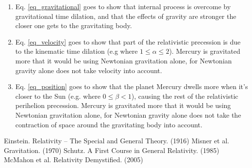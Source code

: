 \documentclass[12pt]{article}
\begin{document}
\begin{enumerate}
\item
Eq. \ref{eq_gravitational} goes to show that internal process is overcome by gravitational time dilation, and that the effects of gravity are stronger the closer one gets to the gravitating body.

\item
Eq. \ref{eq_velocity} goes to show that part of the relativistic precession is due to the kinematic time dilation (e.g where $1 \leq \alpha \leq 2$). Mercury is gravitated more that it would be using Newtonian gravitation alone, for Newtonian gravity alone does not take velocity into account.

\item
Eq. \ref{eq_position} goes to show that the planet Mercury dwells more when it's closer to the Sun (e.g. where $0 \leq \beta < 1$), causing the rest of the relativistic perihelion precession. Mercury is gravitated more that it would be using Newtonian gravitation alone, for Newtonian gravity alone does not take the contraction of space around the gravitating body into account.



\end{enumerate}







\begin{thebibliography}{9}

 Einstein. Relativity -- The Special and General Theory. (1916)
 Misner et al. Gravitation. (1970)
 Schutz. A First Course in General Relativity. (1985)
 McMahon et al. Relativity Demystified. (2005)

\end{thebibliography}
\end{document}
